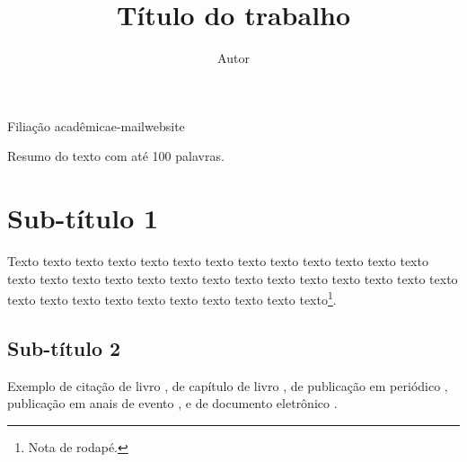 \documentclass{article}
\begin{document}
\graphicspath{{figs-out/}{out/}}


\title{Título do trabalho}
\author{Autor}{Filiação acadêmica}{e-mail}{website}

\begin{sumario}
  Resumo do texto com até 100 palavras.  
\end{sumario}



\section{Sub-título 1}
\label{sec:sub-titulo-1}

Texto texto texto texto texto texto texto texto texto texto texto
texto texto texto texto texto texto texto texto texto texto texto
texto texto texto texto texto texto texto texto texto texto texto
texto texto texto texto\footnote{Nota de rodapé.}.

\subsection{Sub-título 2}
\label{sec:sub-titulo-2}

Exemplo de citação de livro \cite{turabian96:manual}, de capítulo de
livro \cite[275]{kliewer75:aspects}, de publicação em periódico
\cite{forte02:olivier}, publicação em anais de evento
\cite{kroger.ea06:processo}, e de documento eletrônico .



\renewcommand{\refname}{Referências Bibliográficas}



\end{document}
